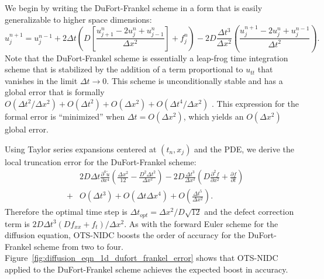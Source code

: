 \documentclass[fleqn,12pt,twoside]{article}
\newcommand{\beq}{\begin{equation}}
\newcommand{\eeq}{\end{equation}}
\newcommand{\bea}{\begin{eqnarray}}
\newcommand{\eea}{\end{eqnarray}}
\def\pt{\partial t}
\def\px{\partial x}
\def\tu{\tilde{u}}
\def\dt{\Delta t}
\def\dx{\Delta x}
\def\dto{\dt_{opt}}
\begin{document}
We begin by writing the DuFort-Frankel scheme in a form that is easily 
generalizable to higher space dimensions:
\beq
  u^{n+1}_j = u^{n-1}_j 
  + 2 \dt 
    \left( D \left[\frac{u^{n}_{j+1} -2 u^{n}_j + u^{n}_{j-1}}{\dx^2}\right] 
         + f^n_j \right)
  - 2 D \frac{\dt^3}{\dx^2}
    \left( \frac{u^{n+1}_j -2 u^{n}_j + u^{n-1}_j}{\dt^2}\right).
  \label{eq:diffusion_eqn_1d_DF_scheme}
\eeq
Note that the DuFort-Frankel scheme is essentially a leap-frog time integration 
scheme that is stabilized by the addition of a term proportional to $u_{tt}$
that vanishes in the limit $\dt \rightarrow 0$.  This scheme is 
unconditionally stable and has a global error that is formally 
$O(\dt^2/\dx^2) + O(\dt^2) + O(\dx^2) + O(\dt^4/\dx^2)$ \cite{gko_book}.  
This expression for the formal error is ``minimized'' when $\dt = O(\dx^2)$, 
which yields an $O(\dx^2)$ global error.

Using Taylor series expansions centered at $(t_n, x_j)$ and the PDE, we derive
the local truncation error for the DuFort-Frankel scheme:
\bea
  & & 2D \dt \frac{\partial^4 \tu}{\px^4}
  \left(\frac{\dx^2}{12} - \frac{D^2 \dt^2}{\dx^2} \right)
  - 2 D \frac{\dt^3}{\dx^2} \left(D \frac{\partial^2 f}{\px^2}  
                                 + \frac{\partial f}{\pt} \right)
  \nonumber \\
  &+& O(\dt^3) + O(\dt \dx^4) + O\left(\frac{\dt^5}{\dx^2} \right).
\eea
Therefore the optimal time step is $\dto = \dx^2/D\sqrt{12}$ and the defect
correction term is $2 D \dt^3 \left(D f_{xx} + f_{t} \right)/\dx^2$.  As with 
the forward Euler scheme for the diffusion equation, OTS-NIDC boosts the
order of accuracy for the DuFort-Frankel scheme from two to four.  
Figure~\ref{fig:diffusion_eqn_1d_dufort_frankel_error} shows that OTS-NIDC
applied to the DuFort-Frankel scheme achieves the expected boost in accuracy. 
\end{document}
